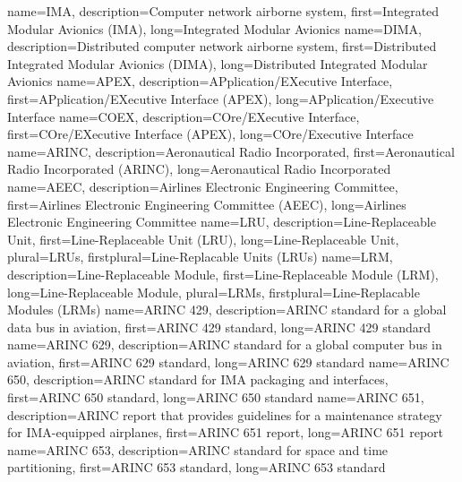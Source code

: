 {%
    name={IMA},
    description={Computer network airborne system},
    first={Integrated Modular Avionics (IMA)},
    long={Integrated Modular Avionics}
}
{%
    name={DIMA},
    description={Distributed computer network airborne system},
    first={Distributed Integrated Modular Avionics (DIMA)},
    long={Distributed Integrated Modular Avionics}
}
{%
    name={APEX},
    description={APplication/EXecutive Interface},
    first={APplication/EXecutive Interface (APEX)},
    long={APplication/Executive Interface}
}
{%
    name={COEX},
    description={COre/EXecutive Interface},
    first={COre/EXecutive Interface (APEX)},
    long={COre/Executive Interface}
}
{%
    name={ARINC},
    description={Aeronautical Radio Incorporated},
    first={Aeronautical Radio Incorporated (ARINC)},
    long={Aeronautical Radio Incorporated}
}
{%
    name={AEEC},
    description={Airlines Electronic Engineering Committee},
    first={Airlines Electronic Engineering Committee (AEEC)},
    long={Airlines Electronic Engineering Committee}
}
{%
    name={LRU},
    description={Line-Replaceable Unit},
    first={Line-Replaceable Unit (LRU)},
    long={Line-Replaceable Unit},
    plural={LRUs},
    firstplural={Line-Replacable Units (LRUs)}
}
{%
    name={LRM},
    description={Line-Replaceable Module},
    first={Line-Replaceable Module (LRM)},
    long={Line-Replaceable Module},
    plural={LRMs},
    firstplural={Line-Replacable Modules (LRMs)}
}
{%
    name={ARINC 429},
    description={ARINC standard for a global data bus in aviation},
    first={ARINC 429 standard},
    long={ARINC 429 standard}
}
{%
    name={ARINC 629},
    description={ARINC standard for a global computer bus in aviation},
    first={ARINC 629 standard},
    long={ARINC 629 standard}
}
{%
    name={ARINC 650},
    description={ARINC standard for IMA packaging and interfaces},
    first={ARINC 650 standard},
    long={ARINC 650 standard}
}
{%
    name={ARINC 651},
    description={ARINC report that provides guidelines for a maintenance strategy for IMA-equipped airplanes},
    first={ARINC 651 report},
    long={ARINC 651 report}
}
{%
    name={ARINC 653},
    description={ARINC standard for space and time partitioning},
    first={ARINC 653 standard},
    long={ARINC 653 standard}
}
